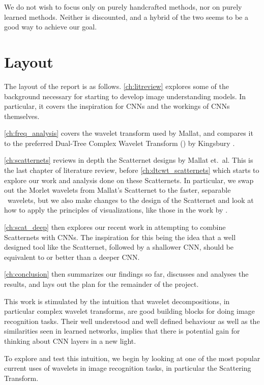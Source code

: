   We do not wish to focus only on purely handcrafted methods, nor on purely
  learned methods. Neither is discounted, and a hybrid of the two seems to be
  a good way to achieve our goal. 

\section{Layout}
  The layout of the report is as follows.
  \autoref{ch:litreview} explores some of the background necessary for starting
  to develop image understanding models. In particular, it covers the
  inspiration for CNNs and the workings of CNNs themselves. 

  \autoref{ch:freq_analysis} covers the wavelet transform used by Mallat, and
  compares it to the preferred Dual-Tree Complex Wavelet Transform (\DTCWT) by
  Kingsbury \cite{kingsbury_complex_2001}.

  \autoref{ch:scatternets} reviews in depth the Scatternet designs by Mallat
  et.\ al.
  This is the last chapter of literature review, before
  \autoref{ch:dtcwt_scatternets} which starts to explore our work and analysis
  done on these Scatternets. In particular, we swap out the Morlet wavelets from
  Mallat's Scatternet to the faster, separable \DTCWT\
  wavelets, but we also make changes to the design of the Scatternet and look at
  how to apply the principles of visualizations, like those in the work by
  \cite{zeiler_visualizing_compact_2014}.

  \autoref{ch:scat_deep} then explores our recent work in attempting to combine
  Scatternets with CNNs. The inspiration for this being the idea that
  a well designed tool like the Scatternet, followed by a shallower CNN, should
  be equivalent to or better than a deeper CNN.

  \autoref{ch:conclusion} then summarizes our findings so far, discusses and
  analyses the results, and lays out the plan for the remainder of the project.
  

This work is stimulated by the intuition that wavelet decompositions, in particular
complex wavelet transforms, are good building blocks for doing image recognition
tasks. Their well understood and well defined behaviour as well as the
similarities seen in learned networks, implies that there is potential gain for
thinking about CNN layers in a new light. 

To explore and test this intuition, we begin by looking at one of the most popular current uses of
wavelets in image recognition tasks, in particular the Scattering Transform. 

